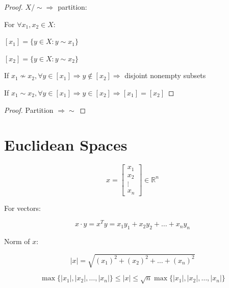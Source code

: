 \documentclass{article}
\begin{document}
\begin{proof}
    $X/\sim \Rightarrow$ partition:

    For $\forall x_{1}, x_{2} \in X:$

    $[x_{1}]=\{y \in X: y \sim x_{1}\}$

    $[x_{2}]=\{y \in X: y \sim x_{2}\}$


    If $x_{1} \nsim x_{2}, \forall y \in [x_{1}] \Rightarrow y \notin [x_{2}] \Rightarrow$ disjoint nonempty subsets

    If $x_{1} \sim x_{2}, \forall y \in [x_{1}] \Rightarrow y \in [x_{2}] \Rightarrow [x_{1}] = [x_{2}]$
\end{proof}

\begin{proof}
    Partition $\Rightarrow \sim$
\end{proof}

\section{Euclidean Spaces}

\begin{equation*}
    x =
    \begin{bmatrix}
        x_{1}  \\
        x_{2}  \\
        \vdots \\
        x_{n}
    \end{bmatrix}
    \in \mathbb{R}^{n}
\end{equation*}

\begin{definition}
    For vectors:

    \begin{equation*}
        x \cdot y = x^{T}y = x_{1}y_{1} + x_{2}y_{2} + \dots + x_{n}y_{n}
    \end{equation*}
\end{definition}

\begin{definition}
    Norm of $x$:

    \begin{equation*}
        |x| = \sqrt{(x_{1})^2 + (x_{2})^2 + \dots + (x_{n})^2}
    \end{equation*}
\end{definition}

\begin{exercise}
    \begin{equation*}
        \max \{|x_{1}|,|x_{2}|,\dots,|x_{n}|\} \leq |x| \leq \sqrt{n} \max \{|x_{1}|,|x_{2}|,\dots,|x_{n}|\}
    \end{equation*}
\end{exercise}
\end{document}
